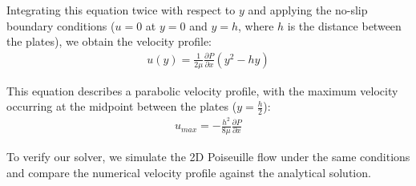 Integrating this equation twice with respect to $y$ and applying the no-slip boundary conditions ($u=0$ at $y=0$ and $y=h$, where $h$ is the distance between the plates), we obtain the velocity profile:
\begin{align}
    u(y) = \frac{1}{2\mu} \frac{\partial P}{\partial x} (y^2 - hy)
\end{align}

This equation describes a parabolic velocity profile, with the maximum velocity occurring at the midpoint between the plates ($y = \frac{h}{2}$):
\begin{align}
    u_{max} = -\frac{h^2}{8\mu} \frac{\partial P}{\partial x}
\end{align}

To verify our solver, we simulate the 2D Poiseuille flow under the same conditions and compare the numerical velocity profile against the analytical solution.
